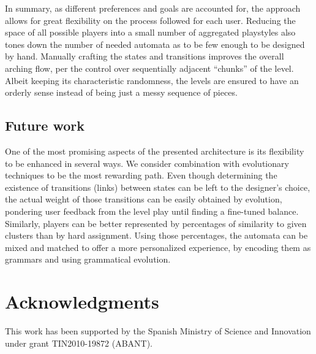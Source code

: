 \documentclass[conference]{IEEEtran}
\begin{document}
In summary, as different preferences and goals are accounted for, the approach allows for great flexibility on the process followed for each user. Reducing the space of all possible players into a small number of aggregated playstyles also tones down the number of needed automata as to be few enough to be designed by hand. Manually crafting the states and transitions improves the overall arching flow, per the control over sequentially adjacent ``chunks'' of the level. Albeit keeping its characteristic randomness, the levels are ensured to have an orderly sense instead of being just a messy sequence of pieces.

\subsection*{Future work}

One of the most promising aspects of the presented architecture is its flexibility to be enhanced in several ways. We consider combination with evolutionary techniques to be the most rewarding path. Even though determining the existence of transitions (links) between states can be left to the designer's choice, the actual weight of those transitions can be easily obtained by evolution, pondering user feedback from the level play until finding a fine-tuned balance. Similarly, players can be better represented by percentages of similarity to given clusters than by hard assignment. Using those percentages, the automata can be mixed and matched to offer a more personalized experience, by encoding them as grammars and using grammatical evolution.

\section*{Acknowledgments}
This work has been supported by the
Spanish Ministry of Science and Innovation under grant
TIN2010-19872 (ABANT).



%

%
\end{document}
